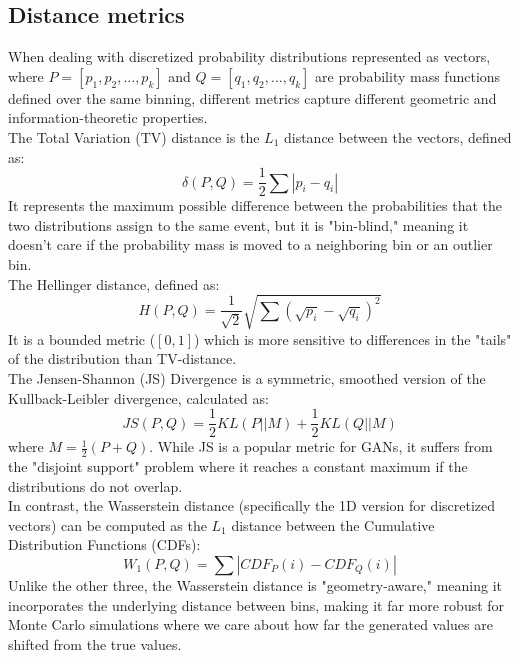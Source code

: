 \subsection{Distance metrics}
When dealing with discretized probability distributions represented as vectors,
where $P = [p_1, p_2, \dots, p_k]$ and $Q = [q_1, q_2, \dots, q_k]$ are probability mass functions defined over the same binning, 
different metrics capture different geometric and information-theoretic properties.\\

The Total Variation (TV) distance is the $L_1$ distance between the vectors, defined as:
\begin{equation}
    \label{eq: TV_distance}
    \delta(P, Q) = \frac{1}{2} \sum |p_i - q_i|
\end{equation}
It represents the maximum possible difference between the probabilities that the two distributions assign to the same event,
but it is "bin-blind," meaning it doesn't care if the probability mass is moved to a neighboring bin or an outlier bin.\\
The Hellinger distance, defined as:
\begin{equation}
    H(P, Q) = \frac{1}{\sqrt{2}} \sqrt{\sum (\sqrt{p_i} - \sqrt{q_i})^2}
\end{equation}
It is a bounded metric ($[0, 1]$) which is more sensitive to differences in the "tails" of the distribution than TV-distance.\\
The Jensen-Shannon (JS) Divergence is a symmetric, smoothed version of the Kullback-Leibler divergence, calculated as:
\begin{equation}
    JS(P, Q) = \frac{1}{2}KL(P || M) + \frac{1}{2}KL(Q || M)
\end{equation}
where $M = \frac{1}{2}(P + Q)$. While JS is a popular metric for GANs, it suffers from the "disjoint support" problem where it reaches a constant maximum if the distributions do not overlap.\\
In contrast, the Wasserstein distance (specifically the 1D version for discretized vectors) can be computed as the $L_1$ distance between the Cumulative Distribution Functions (CDFs): 
\begin{equation}
    W_1(P, Q) = \sum |CDF_P(i) - CDF_Q(i)|
\end{equation}
Unlike the other three, the Wasserstein distance is "geometry-aware," meaning it incorporates the underlying distance between bins, making it far more robust for Monte Carlo simulations where we care about how far the generated values are shifted from the true values.

